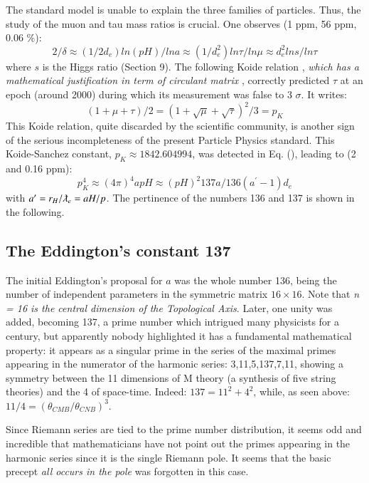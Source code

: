 \documentclass[twoside,draft]{article}
\begin{document}
\begin{sloppypar}
The standard model is unable to explain the three families of particles. Thus, the study of the muon and tau mass ratios is crucial. One observes (1 ppm, 56 ppm, 0.06 \%):
\begin{equation}
2/\delta \approx (1/2d_{e}) ln(pH)/lna \approx (1/d_e^{2})ln\tau/ln\mu\approx d_e^2 lns/ln\tau
\end{equation}
where $s$ is the Higgs ratio (Section 9).
The following Koide relation \cite{Koide}, \textit{ which has a mathematical justification in term of circulant matrix} \cite{Brannen}, correctly predicted $\tau$ at an epoch (around 2000) during which its measurement was false to 3 $\sigma$. It writes:
\begin{equation}
(1 + \mu + \tau)/2 = (1 + \sqrt\mu + \sqrt\tau)^2/3 = p_K
\end{equation}
This Koide relation, quite discarded by the scientific community, is another sign of the serious incompleteness of the present Particle Physics standard.
This Koide-Sanchez constant, $p_K \approx 1842.604994$, was detected in Eq. (), leading to (2 and 0.16 ppm):
\begin{equation}
p_K^4 \approx (4\pi)^4 apH \approx (pH)^2 137a/136(a^{\prime}-1) d_e
\end{equation}
with $a^{\prime} = r_H/\lambdabar_e = aH/p$. The pertinence of the numbers 136 and 137 is shown in the following.


\subsection{The Eddington's constant 137}

The initial Eddington's proposal for $a$ was the whole number 136, being the number of independent parameters in the symmetric matrix $16 \times 16$. Note that \textit{n = 16 is the central dimension of the Topological Axis}. Later, one unity was added, becoming 137\cite{Eddington}, a prime number which intrigued many physicists for a century, but apparently nobody highlighted it has a fundamental mathematical property: it appears as a singular prime in the series of the maximal primes appearing in the numerator of the harmonic
series: 3,11,5,137,7,11, showing a symmetry between the 11 dimensions of M theory (a synthesis of five string theories) and the 4 of space-time. Indeed: $137 = 11^{2} + 4^{2}$, while, as seen above: $11/4 = (\theta_{CMB}/\theta_{CNB})^{3}$.

Since Riemann series are tied to the prime number distribution, it seems odd and incredible that mathematicians
have not point out the primes appearing in the harmonic series since it is the single Riemann pole. It seems
that the basic precept \textit{all occurs in the pole} was forgotten in this case. 


\end{sloppypar}
\end{document}
